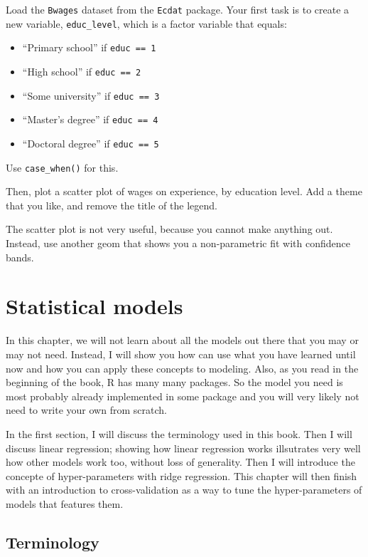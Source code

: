 \documentclass[
]{article}
\providecommand{\tightlist}{%
  \setlength{\itemsep}{0pt}\setlength{\parskip}{0pt}}
\begin{document}
Load the \texttt{Bwages} dataset from the \texttt{Ecdat} package. Your first task is to create a new variable,
\texttt{educ\_level}, which is a factor variable that equals:

\begin{itemize}
\tightlist
\item
  ``Primary school'' if \texttt{educ\ ==\ 1}
\item
  ``High school'' if \texttt{educ\ ==\ 2}
\item
  ``Some university'' if \texttt{educ\ ==\ 3}
\item
  ``Master's degree'' if \texttt{educ\ ==\ 4}
\item
  ``Doctoral degree'' if \texttt{educ\ ==\ 5}
\end{itemize}

Use \texttt{case\_when()} for this.

Then, plot a scatter plot of wages on experience, by education level. Add a theme that you like,
and remove the title of the legend.

The scatter plot is not very useful, because you cannot make anything out. Instead, use another
geom that shows you a non-parametric fit with confidence bands.

\hypertarget{statistical-models}{%
\section{Statistical models}\label{statistical-models}}

In this chapter, we will not learn about all the models out there that you may or may not need.
Instead, I will show you how can use what you have learned until now and how you can apply these
concepts to modeling. Also, as you read in the beginning of the book, R has many many packages. So
the model you need is most probably already implemented in some package and you will very likely
not need to write your own from scratch.

In the first section, I will discuss the terminology used in this book. Then I will discuss
linear regression; showing how linear regression works illsutrates very well how other models
work too, without loss of generality. Then I will introduce the concepte of hyper-parameters
with ridge regression. This chapter will then finish with an introduction to cross-validation as
a way to tune the hyper-parameters of models that features them.

\hypertarget{terminology}{%
\subsection{Terminology}\label{terminology}}
\end{document}

